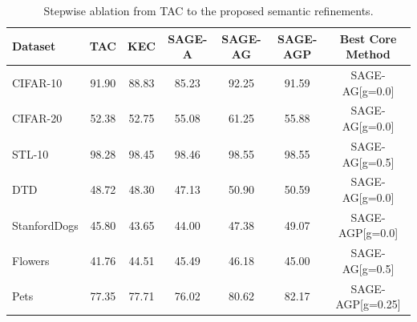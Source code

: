 \begin{table}[t]
\centering
\caption{Stepwise ablation from TAC to the proposed semantic refinements.}
\label{tab:ablation_core}
\begin{tabular}{lcccccc}
\toprule
Dataset & TAC & KEC & SAGE-A & SAGE-AG & SAGE-AGP & Best Core Method \\
\midrule
CIFAR-10 & 91.90 & 88.83 & 85.23 & 92.25 & 91.59 & SAGE-AG[g=0.0] \\
CIFAR-20 & 52.38 & 52.75 & 55.08 & 61.25 & 55.88 & SAGE-AG[g=0.0] \\
STL-10 & 98.28 & 98.45 & 98.46 & 98.55 & 98.55 & SAGE-AG[g=0.5] \\
DTD & 48.72 & 48.30 & 47.13 & 50.90 & 50.59 & SAGE-AG[g=0.0] \\
StanfordDogs & 45.80 & 43.65 & 44.00 & 47.38 & 49.07 & SAGE-AGP[g=0.0] \\
Flowers & 41.76 & 44.51 & 45.49 & 46.18 & 45.00 & SAGE-AG[g=0.5] \\
Pets & 77.35 & 77.71 & 76.02 & 80.62 & 82.17 & SAGE-AGP[g=0.25] \\
\bottomrule
\end{tabular}
\end{table}